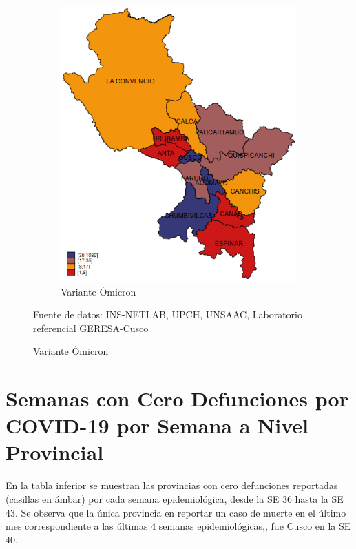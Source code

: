\documentclass[12pt,a4paper,openany]{book}
\begin{document}
\begin{figure}[h]
\begin{subfigure}[b]{0.40\textwidth}
			\includegraphics[width=\textwidth]{../figuras/variantes_provincial_omicron.png}
			\caption{Variante Ómicron}
		\end{subfigure}
	{\footnotesize {Fuente de datos: INS-NETLAB, UPCH, UNSAAC, Laboratorio referencial GERESA-Cusco}}
	\end{figure}
	
	\clearpage
	
	
	
	\clearpage
	\section*{Semanas con Cero Defunciones por COVID-19 por Semana a Nivel Provincial}
	
	\noindent En la tabla inferior se muestran las provincias con cero defunciones reportadas (casillas en ámbar) por cada semana epidemiológica, desde la SE 36 hasta la SE 43. 
	Se observa que la única provincia en reportar un caso de muerte en el último mes correspondiente a las últimas 4 semanas epidemiológicas,, fue Cusco en la SE 40.
	
\end{document}
